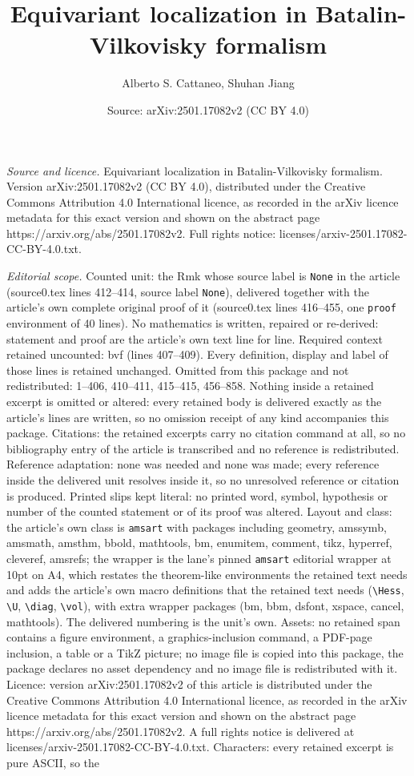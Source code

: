 \documentclass[10pt,a4paper]{amsart}
\title[Equivariant localization in Batalin-Vilkovisky formalism]{Equivariant localization in Batalin-Vilkovisky formalism}
\author{Alberto S. Cattaneo, Shuhan Jiang}
\date{Source: arXiv:2501.17082v2 (CC BY 4.0)}
\begin{document}
\maketitle

\noindent\emph{Source and licence.} Equivariant localization in Batalin-Vilkovisky formalism. Version arXiv:2501.17082v2 (CC BY 4.0), distributed under the Creative Commons Attribution 4.0 International licence, as recorded in the arXiv licence metadata for this exact version and shown on the abstract page https://arxiv.org/abs/2501.17082v2. Full rights notice: licenses/arxiv-2501.17082-CC-BY-4.0.txt.\par\smallskip

\noindent\textit{Editorial scope.} Counted unit: the Rmk whose source label is \texttt{None} in the article (source0.tex lines 412--414, source label \texttt{None}), delivered together with the article's own complete original proof of it (source0.tex lines 416--455, one \texttt{proof} environment of 40 lines). No mathematics is written, repaired or re-derived: statement and proof are the article's own text line for line. Required context retained uncounted: bvf (lines 407--409). Every definition, display and label of those lines is retained unchanged. Omitted from this package and not redistributed: 1--406, 410--411, 415--415, 456--858. Nothing inside a retained excerpt is omitted or altered: every retained body is delivered exactly as the article's lines are written, so no omission receipt of any kind accompanies this package. Citations: the retained excerpts carry no citation command at all, so no bibliography entry of the article is transcribed and no reference is redistributed. Reference adaptation: none was needed and none was made; every reference inside the delivered unit resolves inside it, so no unresolved reference or citation is produced. Printed slips kept literal: no printed word, symbol, hypothesis or number of the counted statement or of its proof was altered. Layout and class: the article's own class is \texttt{amsart} with packages including geometry, amssymb, amsmath, amsthm, bbold, mathtools, bm, enumitem, comment, tikz, hyperref, cleveref, amsrefs; the wrapper is the lane's pinned \texttt{amsart} editorial wrapper at 10pt on A4, which restates the theorem-like environments the retained text needs and adds the article's own macro definitions that the retained text needs (\texttt{\textbackslash Hess}, \texttt{\textbackslash U}, \texttt{\textbackslash diag}, \texttt{\textbackslash vol}), with extra wrapper packages (bm, bbm, dsfont, xspace, cancel, mathtools). The delivered numbering is the unit's own. Assets: no retained span contains a figure environment, a graphics-inclusion command, a PDF-page inclusion, a table or a TikZ picture; no image file is copied into this package, the package declares no asset dependency and no image file is redistributed with it. Licence: version arXiv:2501.17082v2 of this article is distributed under the Creative Commons Attribution 4.0 International licence, as recorded in the arXiv licence metadata for this exact version and shown on the abstract page https://arxiv.org/abs/2501.17082v2. A full rights notice is delivered at licenses/arxiv-2501.17082-CC-BY-4.0.txt. Characters: every retained excerpt is pure ASCII, so the 
\end{document}
